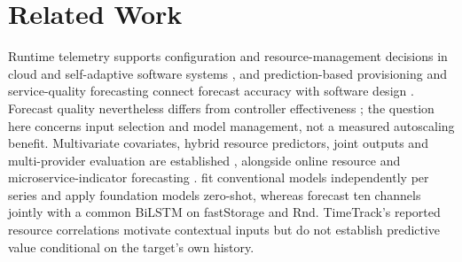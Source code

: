 \documentclass[5p,twocolumn]{elsarticle}
\begin{document}
\section{Related Work}
\label{sec:related-work}

Runtime telemetry supports configuration and resource-management decisions in
cloud and self-adaptive software systems
\citep{Taherizadeh2018Monitoring,Bauer2020SelfAware}, and prediction-based
provisioning and service-quality forecasting connect forecast accuracy with
software design \citep{Calheiros2015ARIMA,Syu2017DynamicQoS}. Forecast quality
nevertheless differs from controller effectiveness \citep{Qu2018Autoscaling};
the question here concerns input selection and model management, not a
measured autoscaling benefit. Multivariate covariates, hybrid resource
predictors, joint outputs and multi-provider evaluation are established
\citep{Tran2018MultivariateFuzzy,Xu2022esDNN,Tripathi2025MMRP,
Rossi2025CloudUncertainty,Zhang2025SWTCLSTM}, alongside online resource and
microservice-indicator forecasting \citep{Gao2026OMCR,Gao2026MaMiClif}.
\citet{DiMenna2026RuntimeForecasting} fit conventional models independently
per series and apply foundation models zero-shot, whereas
\citet{Ullah2023CloudBiLSTM} forecast ten channels jointly with a common
BiLSTM on fastStorage and Rnd. TimeTrack's reported resource correlations
\citep{Meliani2025TimeTrack} motivate contextual inputs but do not establish
predictive value conditional on the target's own history.
\end{document}
